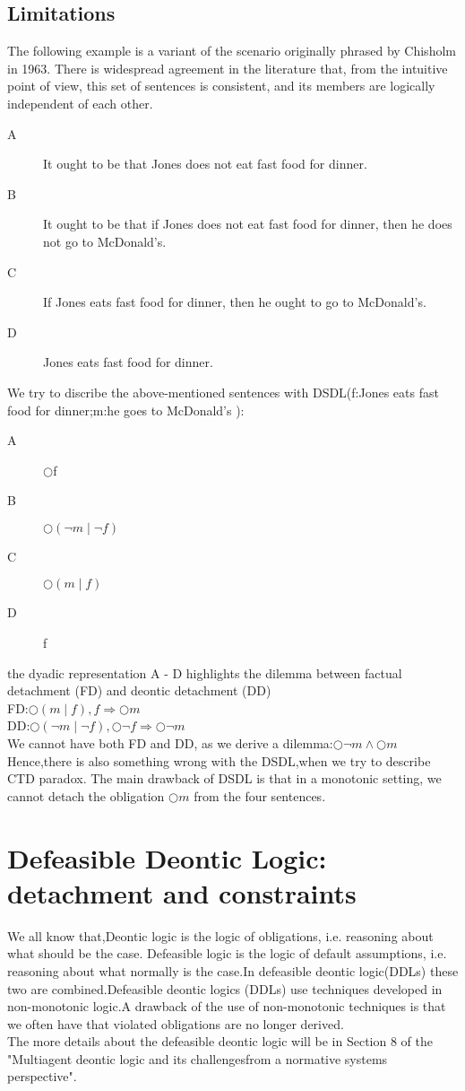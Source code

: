 \documentclass{article}
\begin{document}
\subsection{Limitations}
The following example is a variant of the scenario originally phrased by Chisholm in
1963. There is widespread agreement in the literature that, from the intuitive point
of view, this set of sentences is consistent, and its members are logically independent
of each other.
\begin{description}
\item[A]It ought to be that Jones does not eat fast food for dinner.
\item[B]It ought to be that if Jones does not eat fast food for dinner, then he does not go to McDonald’s.
\item[C] If Jones eats fast food for dinner, then he ought to go to McDonald’s.
\item[D]Jones eats fast food for dinner.
\end{description}
We try to discribe the above-mentioned sentences with DSDL(f:Jones eats fast food for dinner;m:he goes to McDonald’s ):
\begin{description}
\item[A]$\bigcirc$f
\item[B]$\bigcirc(\neg m \mid \neg f)$
\item[C]$\bigcirc(m\mid f)$
\item[D]f
\end{description}
the dyadic representation A - D highlights the dilemma between factual detachment (FD) and deontic detachment (DD)\\
FD:$\bigcirc(m\mid f),f \Rightarrow \bigcirc m$\\
DD:$\bigcirc(\neg m \mid \neg f), \bigcirc\neg f \Rightarrow \bigcirc\neg m$\\
We cannot have both FD and DD, as we derive a dilemma:$\bigcirc\neg m\wedge\bigcirc m$\\
Hence,there is also something wrong with the DSDL,when we try to describe CTD paradox.
The main drawback of DSDL is that in a monotonic setting, we cannot detach
the obligation $\bigcirc m$ from the four sentences.
\section{Defeasible Deontic Logic: detachment and constraints}
We all know that,Deontic logic is the logic of obligations, i.e. reasoning about what should be the case. Defeasible logic is the logic of default assumptions, i.e. reasoning about what normally is the case.In defeasible deontic logic(DDLs) these two are combined.Defeasible deontic logics (DDLs) use techniques developed in non-monotonic logic.A drawback of the use of non-monotonic techniques is that we often have that
violated obligations are no longer derived.\\
The more details about the defeasible deontic logic will be in Section 8 of the "Multiagent deontic logic and its challengesfrom a normative systems perspective".
\end{document}
